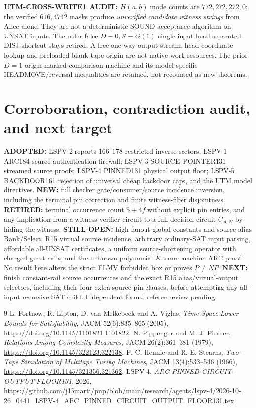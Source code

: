 \documentclass[11pt]{article}
\begin{document}
\textbf{UTM-CROSS-WRITE1 AUDIT:}
$H(a,b)$ mode counts are $772,272,272,0$; the verified $616,4742$
masks produce \emph{unverified candidate witness strings} from Alice
alone. They are not a deterministic SOUND acceptance algorithm on
UNSAT inputs. The older false $D=0,S=O(1)$ single-input-head
separated-DISJ shortcut stays retired. A free one-way output stream,
head-coordinate lookup and preloaded blank-tape origin are not
native work resources. The prior $D=1$ origin-marked comparison
machine and its model-specific HEADMOVE/reversal inequalities are
retained, not recounted as new theorems.

\section{Corroboration, contradiction audit, and next target}
\textbf{ADOPTED:} LSPV-2 reports 166--178 restricted inverse
sectors; LSPV-1 ARC184 source-authentication firewall; LSPV-3
SOURCE--POINTER131 streamed source proofs; LSPV-4 PINNED131 physical
output floor; LSPV-5 BACKDOOR161 rejection of universal cheap
backdoor caps, and the UTM model directives.
\textbf{NEW:} full checker gate/consumer/source incidence inversion,
including the terminal pin correction and finite witness-fiber disjointness.
\textbf{RETIRED:} terminal occurrence count $5+4f$ without explicit
pin entries, and any implication from a witness-verifier circuit
to a full decision circuit $C_{A,N}$ by hiding the witness.
\textbf{STILL OPEN:} high-fanout global constants and source-alias
Rank/Select, R15 virtual source incidence, arbitrary ordinary-SAT
input parsing, affordable all-UNSAT certificates, a uniform
source-shortening operator with charged guest calls, and the
unknown polynomial-$K$ same-machine ARC proof. No result here
alters the strict FLMV forbidden box or proves $P\ne NP$.
\textbf{NEXT:} finish constant-rail source occurrences and the
exact R15 alias/virtual-output selectors, including their
four extra source pin clauses, before attempting any all-input
recursive SAT child. Independent formal referee review pending.

\begin{thebibliography}{9}
 L. Fortnow, R. Lipton, D. van Melkebeek and A. Viglas,
\emph{Time-Space Lower Bounds for Satisfiability}, JACM 52(6):835--865 (2005),
\url{https://doi.org/10.1145/1101821.1101822}.
 N. Pippenger and M. J. Fischer,
\emph{Relations Among Complexity Measures}, JACM 26(2):361--381 (1979),
\url{https://doi.org/10.1145/322123.322138}.
 F. C. Hennie and R. E. Stearns,
\emph{Two-Tape Simulation of Multitape Turing Machines}, JACM 13(4):533--546 (1966),
\url{https://doi.org/10.1145/321356.321362}.
 LSPV-4, \emph{ARC-PINNED-CIRCUIT-OUTPUT-FLOOR131}, 2026,
\url{https://github.com/j15marti/pnp/blob/main/research/agents/lspv-4/2026-10-26_0441_LSPV-4_ARC_PINNED_CIRCUIT_OUTPUT_FLOOR131.tex}.
\end{thebibliography}
\end{document}
